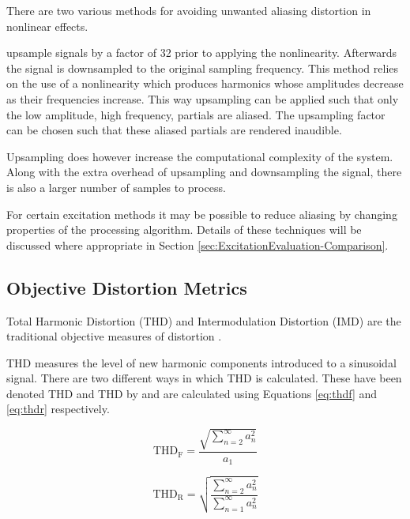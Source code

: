 			There are two various methods for avoiding unwanted aliasing distortion in nonlinear effects.

			\citep{vetter2013estimation} upsample signals by a factor of 32 prior to applying the nonlinearity.
			Afterwards the signal is downsampled to the original sampling frequency. This method relies on the
			use of a nonlinearity which produces harmonics whose amplitudes decrease as their frequencies
			increase. This way upsampling can be applied such that only the low amplitude, high frequency,
			partials are aliased. The upsampling factor can be chosen such that these aliased partials are
			rendered inaudible.

			Upsampling does however increase the computational complexity of the system. Along with the extra
			overhead of upsampling and downsampling the signal, there is also a larger number of samples to
			process.

			For certain excitation methods it may be possible to reduce aliasing by changing properties of the
			processing algorithm. Details of these techniques will be discussed where appropriate in Section
			\ref{sec:ExcitationEvaluation-Comparison}.

	\subsection{Objective Distortion Metrics}
	\label{sec:Excitation-Analysis-Metrics}
		Total Harmonic Distortion (THD) and Intermodulation Distortion (IMD) are the traditional objective measures
		of distortion \citep{czerwinski2001multitone1}. 
		
		THD measures the level of new harmonic components introduced to a sinusoidal signal. There are two different
		ways in which THD is calculated. These have been denoted THD and THD by
		\citet{shmilovitz2005on} and are calculated using Equations \ref{eq:thdf} and \ref{eq:thdr} respectively.

		\begin{equation}
			\textrm{THD}_{\textrm{F}} = \frac{\sqrt{\sum_{n = 2}^{\infty} a_{n}^{2}}}{a_{1}}
			\label{eq:thdf}
		\end{equation}

		\begin{equation}
			\textrm{THD}_{\textrm{R}} = \sqrt{\frac{\sum_{n = 2}^{\infty} a_{n}^{2}}
			                                       {\sum_{n = 1}^{\infty} a_{n}^{2}}}
			\label{eq:thdr}
		\end{equation}

